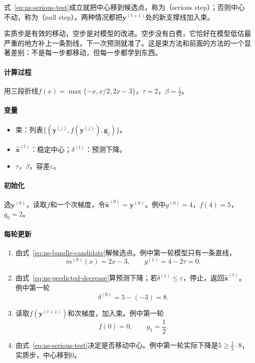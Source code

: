 式~\eqref{eq:ns-serious-test}成立就把中心移到候选点，称为（serious step）；否则中心不动，称为（null step）。两种情况都把$\bm{y}^{(t+1)}$处的新支撑线加入束。

实质步是有效的移动，空步是对模型的改进。空步没有白费，它恰好在模型低估最严重的地方补上一条割线，下一次预测就准了。这是束方法和前面的方法的一个显著差别：不是每一步都移动，但每一步都学到东西。

\paragraph{计算过程}
用三段折线$f(x)=\max\{-x,x/2,2x-3\}$，$\tau=2$，$\beta=\tfrac12$。

\paragraph{变量}
\begin{itemize}
 \item 束：列表$\{(\bm{y}^{(j)},f(\bm{y}^{(j)}),\bm{g}_j)\}$。
 \item $\hat{\bm{x}}^{(t)}$：稳定中心；$\delta^{(t)}$：预测下降。
 \item $\tau$，$\beta$，容差$\varepsilon$。
\end{itemize}

\paragraph{初始化}
选$\bm{y}^{(0)}$，读取$f$和一个次梯度，令$\hat{\bm{x}}^{(0)}=\bm{y}^{(0)}$。例中$y^{(0)}=4$，$f(4)=5$，$g_0=2$。

\paragraph{每轮更新}
\begin{enumerate}
 \item 由式~\eqref{eq:ns-bundle-candidate}解候选点。例中第一轮模型只有一条直线，
 \[
  m^{(0)}(x)=2x-3,\qquad y^{(1)}=4-2\tau=0.
 \]
 \item 由式~\eqref{eq:ns-predicted-decrease}算预测下降；若$\delta^{(t)}\leq\varepsilon$，停止，返回$\hat{\bm{x}}^{(t)}$。例中第一轮
 \[
  \delta^{(0)}=5-(-3)=8.
 \]
 \item 读取$f(\bm{y}^{(t+1)})$和次梯度，加入束。例中第一轮
 \[
  f(0)=0,\qquad g_1=\frac12.
 \]
 \item 由式~\eqref{eq:ns-serious-test}决定是否移动中心。例中第一轮实际下降是$5\geq\tfrac12\cdot8$，实质步，中心移到$0$。
\end{enumerate}

